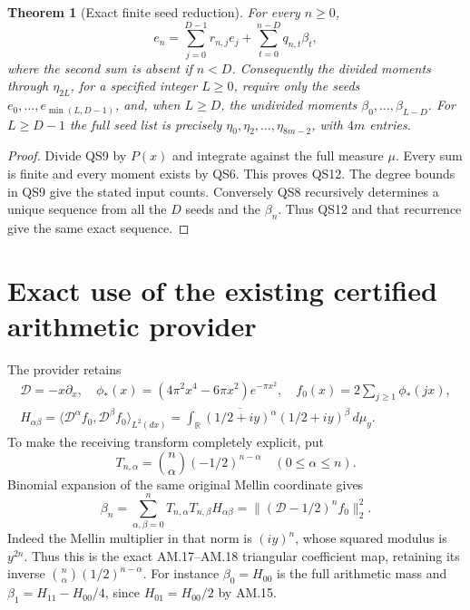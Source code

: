 \documentclass[11pt]{article}
\newtheorem{theorem}{Theorem}
\newcommand{\R}{\mathbb R}
\begin{document}
\begin{theorem}[Exact finite seed reduction]
For every \(n\ge0\),
\begin{equation}\tag{QS12}
 e_n=\sum_{j=0}^{D-1}r_{n,j}e_j+
                  \sum_{t=0}^{n-D}q_{n,t}\beta_t ,
\end{equation}
where the second sum is absent if \(n<D\).
Consequently the divided moments through \(\eta_{2L}\),
for a specified integer \(L\ge0\), require only the seeds
\(e_0,\ldots,e_{\min(L,D-1)}\), and, when \(L\ge D\),
the undivided moments \(\beta_0,\ldots,\beta_{L-D}\).
For \(L\ge D-1\) the full seed list is precisely
\(\eta_0,\eta_2,\ldots,\eta_{8m-2}\), with \(4m\) entries.
\end{theorem}
\begin{proof}
Divide QS9 by \(P(x)\) and integrate against the full measure
\(\mu\). Every sum is finite and every moment exists by QS6.
This proves QS12. The degree bounds in QS9 give the stated
input counts. Conversely QS8 recursively determines a unique
sequence from all the \(D\) seeds and the \(\beta_n\).
Thus QS12 and that recurrence give the same exact sequence.
\end{proof}

\section{Exact use of the existing certified arithmetic provider}

The provider \cite{AM} retains
\begin{equation}\tag{QS13}
\begin{gathered}
 \mathcal D=-x\partial_x,\quad
 \phi_*(x)=(4\pi^2x^4-6\pi x^2)e^{-\pi x^2},\quad
 f_0(x)=2\sum_{j\ge1}\phi_*(jx),\\
 H_{\alpha\beta}
 =\langle\mathcal D^\alpha f_0,\mathcal D^\beta f_0\rangle_{L^2(dx)}
 =\int_{\R}\overline{(1/2+iy)^\alpha}(1/2+iy)^\beta\,d\mu_y .
\end{gathered}
\end{equation}
To make the receiving transform completely explicit, put
\[
 T_{n,\alpha}=\binom n\alpha(-1/2)^{n-\alpha}
                       \quad(0\le\alpha\le n).
\]
Binomial expansion of the same original Mellin coordinate gives
\begin{equation}\tag{QS14}
 \beta_n=\sum_{\alpha,\beta=0}^n
        T_{n,\alpha}T_{n,\beta}H_{\alpha\beta}
       =\|(\mathcal D-1/2)^nf_0\|_2^2.
\end{equation}
Indeed the Mellin multiplier in that norm is \((iy)^n\),
whose squared modulus is \(y^{2n}\). Thus this is the exact
AM.17--AM.18 triangular coefficient map, retaining its inverse
\(\binom n\alpha(1/2)^{n-\alpha}\).
For instance \(\beta_0=H_{00}\) is the full arithmetic mass
and \(\beta_1=H_{11}-H_{00}/4\), since
\(H_{01}=H_{00}/2\) by AM.15.
\end{document}
